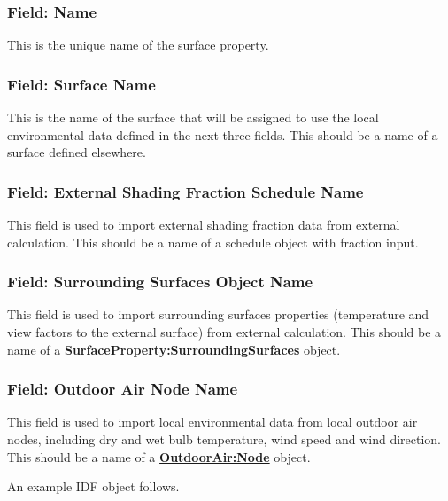 \subsubsection{Field: Name}\label{field-surf-localenv-name}

This is the unique name of the surface property.

\subsubsection{Field: Surface Name}\label{surfacePropertylocalEnvironment-field-surface-name}

This is the name of the surface that will be assigned to use the local environmental data defined in the next three fields.  This should be a name of a surface defined elsewhere.

\subsubsection{Field: External Shading Fraction Schedule Name}\label{field-external-shading-fraction-schedule-name}

This field is used to import external shading fraction data from external calculation. This should be a name of a schedule object with fraction input.

\subsubsection{Field: Surrounding Surfaces Object Name}\label{field-surrounding-surfaces-object-name}

This field is used to import surrounding surfaces properties (temperature and view factors to the external surface) from external calculation. This should be a name of a \textbf{\hyperref[surfacePropertysurroundingSurfaces]{SurfaceProperty:SurroundingSurfaces}} object.

\subsubsection{Field: Outdoor Air Node Name}\label{field-outdoor-air-node-name}

This field is used to import local environmental data from local outdoor air nodes, including dry and wet bulb temperature, wind speed and wind direction. This should be a name of a \textbf{\hyperref[outdoorairnode]{OutdoorAir:Node}} object.

An example IDF object follows.

